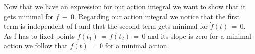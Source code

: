 Now that we have an expression for our action integral we want to show that it
gets minimal for $f \,\equiv\, 0$. Regarding our action integral we notice that
the first term is independent of f and that the second term gets minimal for
$\dot f(t) \,=\, 0$. As f has to fixed points $f(t_1) \,=\, f(t_2) \,=\, 0$ and
its slope is zero for a minimal action we follow that $f(t) \,=\, 0$ for a minimal
action. 



